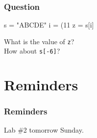 \documentclass[11pt]{beamer}
\begin{document}
\begin{frame}[fragile]
  \frametitle{Question}
  \Enlarge

  \begin{semiverbatim}
s = "ABCDE"
i = (11 %
z = s[i]
  \end{semiverbatim}

  What is the value of \texttt{z}? \\ \pause
  How about \texttt{s[-6]}?
\end{frame}

\section{Reminders}

\begin{frame}
  \frametitle{Reminders}
  \Enlarge

  \begin{itemize}
  \myitem  Lab \#2 tomorrow Sunday. 
  \end{itemize}
\end{frame}
\end{document}
